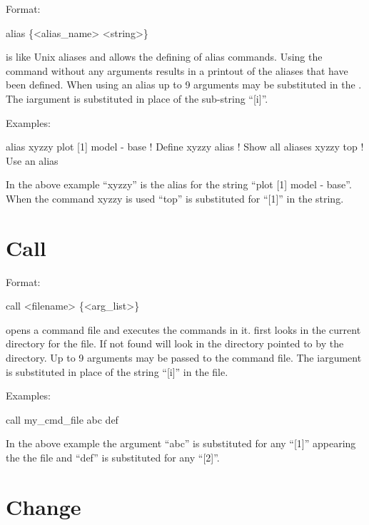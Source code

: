 Format: 
\begin{example}
  alias \{<alias_name> <string>\}
\end{example}

\vskip 0.2in

 is like Unix aliases and allows the defining of alias
commands. Using the  command without any arguments results
in a printout of the aliases that have been defined. When using an
alias up to 9 arguments may be substituted in the . The
i\Th argument is substituted in place of the sub-string ``[i]''.

Examples:
\begin{example}
    alias xyzzy plot [1] model - base  ! Define xyzzy
    alias                              ! Show all aliases
    xyzzy top                          ! Use an alias
\end{example}
In the above example ``xyzzy'' is the alias for the string ``plot [1]
model - base''.  When the command xyzzy is used ``top'' is substituted
for ``[1]'' in the string.

\section{Call}
\label{s:call}

Format: 
\begin{example}
  call <filename> \{<arg_list>\}  \Strut
\end{example}

\vskip 0.2in
 opens a command file and executes the commands in it.  \tao
first looks in the current directory for the file. If not found \tao
will look in the directory pointed to by the 
directory.  Up to 9 arguments may be passed to the command file. The
i\Th argument is substituted in place of the string ``[i]'' in the
file. 

Examples:
\begin{example}
    call my_cmd_file abc def 
\end{example}
In the above example the argument ``abc'' is substituted for any
``[1]'' appearing the the file and ``def'' is substituted for any
``[2]''.

\section{Change}
\label{s:change}

